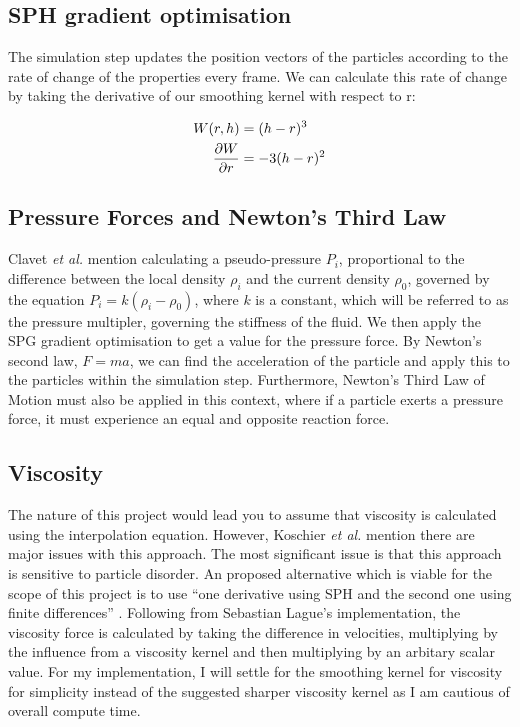 \documentclass[write-up.tex]{subfiles}
\begin{document}
\subsection{SPH gradient optimisation}

The simulation step updates the position vectors of the particles according to the rate of change of the properties every frame. We can calculate this rate of change by taking the derivative of our smoothing kernel with respect to r:

\begin{align*}
W(r, h) &= (h-r)^3 \\
\pdv{W}{r} &= -3(h-r)^2
\end{align*}

\subsection{Pressure Forces and Newton's Third Law}

Clavet \textit{et al.} \cite{clavet} mention calculating a pseudo-pressure $P_i$, proportional to the difference between the local density $\rho_i$ and the current density $\rho_0$, governed by the equation $P_i = k(\rho_i - \rho_0)$, where $k$ is a constant, which will be referred to as the pressure multipler, governing the stiffness of the fluid. We then apply the SPG gradient optimisation to get a value for the pressure force. By Newton's second law, $F = ma$, we can find the acceleration of the particle and apply this to the particles within the simulation step. Furthermore, Newton's Third Law of Motion must also be applied in this context, where if a particle exerts a pressure force, it must experience an equal and opposite reaction force.

\subsection{Viscosity}
The nature of this project would lead you to assume that viscosity is calculated using the interpolation equation. However, Koschier \textit{et al.}\cite{koschier} mention there are major issues with this approach. The most significant issue is that this approach is sensitive to particle disorder. An proposed alternative which is viable for the scope of this project is to use ``one derivative using SPH and the second one using finite differences'' \cite{koschier}. Following from Sebastian Lague's implementation, the viscosity force is calculated by taking the difference in velocities, multiplying by the influence from a viscosity kernel and then multiplying by an arbitary scalar value. For my implementation, I will settle for the smoothing kernel for viscosity for simplicity instead of the suggested sharper viscosity kernel as I am cautious of overall compute time.
\end{document}
